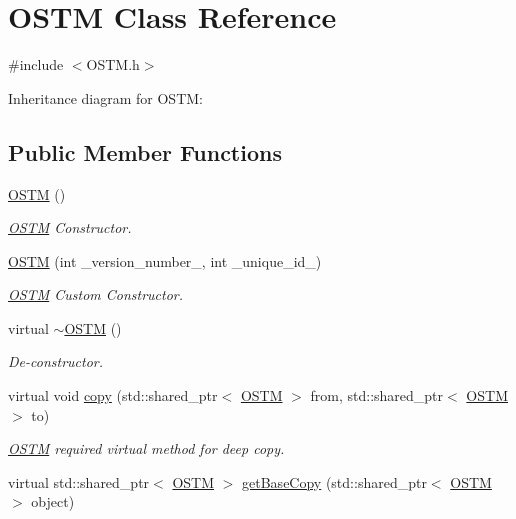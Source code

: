 \hypertarget{class_o_s_t_m}{}\section{O\+S\+TM Class Reference}
\label{class_o_s_t_m}


{\ttfamily \#include $<$O\+S\+T\+M.\+h$>$}



Inheritance diagram for O\+S\+TM\+:
\subsection*{Public Member Functions}
\begin{DoxyCompactItemize}
\item 
\hyperlink{class_o_s_t_m_a968edf778668bd0ec7603f0571619196}{O\+S\+TM} ()
\begin{DoxyCompactList}\small\item\em \hyperlink{class_o_s_t_m}{O\+S\+TM} Constructor. \end{DoxyCompactList}\item 
\hyperlink{class_o_s_t_m_a2314f55a127b94aa8a51d19ba798401e}{O\+S\+TM} (int \+\_\+version\+\_\+number\+\_\+, int \+\_\+unique\+\_\+id\+\_\+)
\begin{DoxyCompactList}\small\item\em \hyperlink{class_o_s_t_m}{O\+S\+TM} Custom Constructor. \end{DoxyCompactList}\item 
virtual \hyperlink{class_o_s_t_m_a30a17d73d0259c60eeab72d6dfa9ceb1}{$\sim$\+O\+S\+TM} ()
\begin{DoxyCompactList}\small\item\em De-\/constructor. \end{DoxyCompactList}\item 
virtual void \hyperlink{class_o_s_t_m_a535d90fced5adbb70312c92f3778e08d}{copy} (std\+::shared\+\_\+ptr$<$ \hyperlink{class_o_s_t_m}{O\+S\+TM} $>$ from, std\+::shared\+\_\+ptr$<$ \hyperlink{class_o_s_t_m}{O\+S\+TM} $>$ to)
\begin{DoxyCompactList}\small\item\em \hyperlink{class_o_s_t_m}{O\+S\+TM} required virtual method for deep copy. \end{DoxyCompactList}\item 
virtual std\+::shared\+\_\+ptr$<$ \hyperlink{class_o_s_t_m}{O\+S\+TM} $>$ \hyperlink{class_o_s_t_m_a0bfa3763bd441407dd6365f42714f94c}{get\+Base\+Copy} (std\+::shared\+\_\+ptr$<$ \hyperlink{class_o_s_t_m}{O\+S\+TM} $>$ object)

\end{DoxyCompactItemize}
